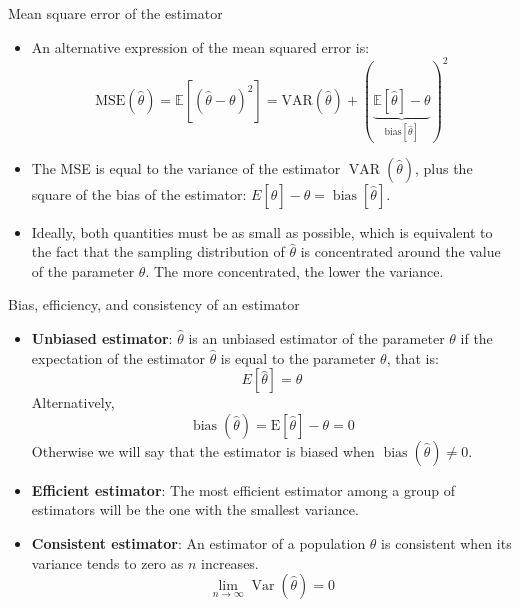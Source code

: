 \documentclass[aspectratio=169]{beamer}
\begin{document}
\begin{frame}{Mean square error of the estimator}
	
	
	\begin{itemize}
	\item An alternative expression of the mean squared error is:
\[
\text{MSE}(\hat{\theta}) = \mathbb{E}\left[(\hat{\theta} - \theta)^2\right] = \text{VAR}(\hat{\theta}) + (\underbrace{{\mathbb{E}[\hat{\theta}] - \theta}}_{\text{bias}[\hat{\theta}]})^2
\]

\item The MSE is equal to the variance of the estimator $\operatorname{VAR}(\hat{\theta})$, plus the square of the bias of the estimator: $E[\hat{\theta}]-\theta=\operatorname{bias}[\hat{\theta}]$.

\item Ideally, both quantities must be as small as possible, which is equivalent to the fact that the sampling distribution of $\hat{\theta}$  is concentrated around the value of the parameter $\theta$. The more concentrated, the lower the variance.
 
	\end{itemize}	
	
\end{frame}
\begin{frame}{Bias, efficiency, and consistency of an estimator}
	
	\begin{itemize}
 
	\item \textbf{Unbiased estimator}: $\hat{\theta}$ is an unbiased estimator of the parameter $\theta$ if the expectation of the estimator $\hat{\theta}$ is equal to the parameter $\theta$, that is:
$$
E[\hat{\theta}]=\theta
$$
Alternatively,
$$
\operatorname{bias}(\hat{\theta})=\mathrm{E}[\hat{\theta}]-\theta=0
$$
Otherwise we will say that the estimator is biased when $\operatorname{bias}(\hat{\theta})\ne 0$.

\item \textbf{Efficient estimator}: The most efficient estimator among a group of estimators will be the one with the smallest variance.

\item \textbf{Consistent estimator}: An estimator of a population $\theta$ is consistent when its variance tends to zero as $n$ increases.
$$
\lim _{n \rightarrow \infty} \operatorname{Var}(\widehat{\theta})=0
$$

 
	\end{itemize}	
	
\end{frame}
\end{document}
